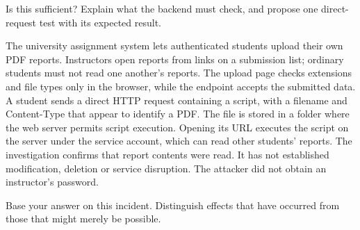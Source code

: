 {Is this sufficient? Explain what the backend must check, and propose one direct-request test with its expected result.}

\answerlabel\answerfill
\newpage
\begin{contenttable}
{The university assignment system lets authenticated students upload their own PDF reports. Instructors open reports from links on a submission list; ordinary students must not read one another’s reports. The upload page checks extensions and file types only in the browser, while the endpoint accepts the submitted data. A student sends a direct HTTP request containing a script, with a filename and Content-Type that appear to identify a PDF.}
{The file is stored in a folder where the web server permits script execution. Opening its URL executes the script on the server under the service account, which can read other students’ reports. The investigation confirms that report contents were read. It has not established modification, deletion or service disruption. The attacker did not obtain an instructor’s password.}
\end{contenttable}
{Base your answer on this incident. Distinguish effects that have occurred from those that might merely be possible.}

